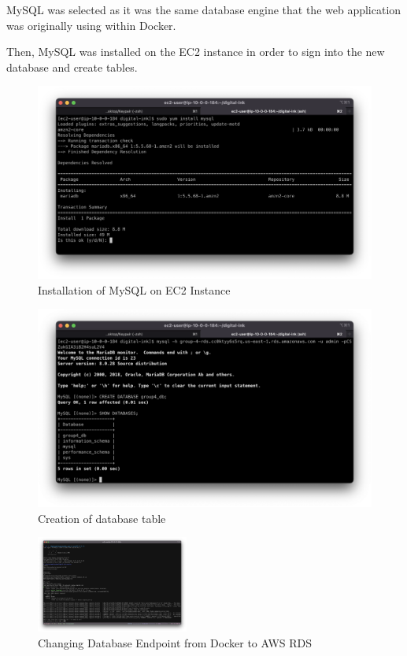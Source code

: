 MySQL was selected as it was the same database engine that the web application was originally using within Docker.

Then, MySQL was installed on the EC2 instance in order to sign into the new database and create tables.

\begin{figure}[!htbp]
\centering
\includegraphics[width=\textwidth]{resources/rds/rds-mysql-install.png}
\caption{Installation of MySQL on EC2 Instance}
\label{fig:rds-msql-install}
\end{figure}

\begin{figure}[!htbp]
\centering
\includegraphics[width=\textwidth]{resources/rds/rds-database-creation.png}
\caption{Creation of database table}
\label{fig:rds-db-create-2}
\end{figure}

\begin{figure}[!htbp]
    \centering
    \includegraphics[width=50mm]{resources/rds/envupdate.png}
    \caption{Changing Database Endpoint from Docker to AWS RDS}
    \label{fig:rds-env-update}
\end{figure}

